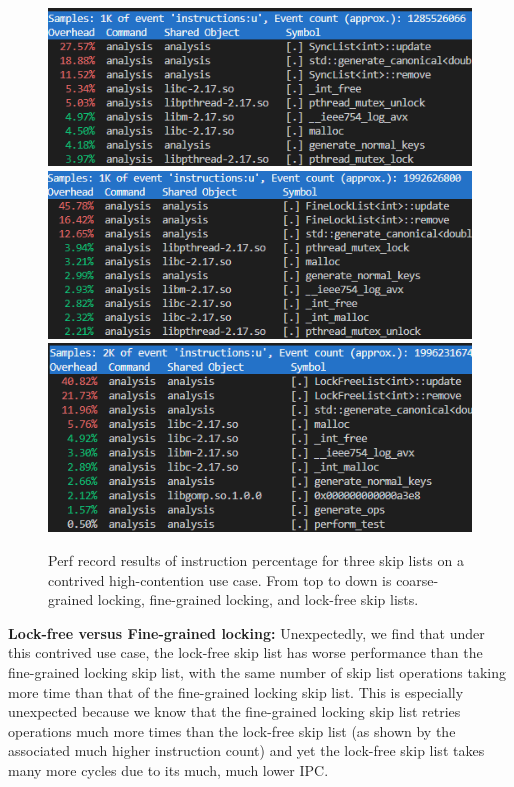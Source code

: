 \documentclass[11pt]{article}
\begin{document}
\begin{figure}[h!]
  \includegraphics[width=5in]{ex2_s0_instructions.png} \\
  \includegraphics[width=5in]{ex2_s1_instructions.png} \\
  \includegraphics[width=5in]{ex2_s2_instructions.png}
  \caption{Perf record results of instruction percentage for three skip lists on a contrived high-contention use case. From top to down is coarse-grained locking, fine-grained locking, and lock-free skip lists. }
\end{figure}

\textbf{Lock-free versus Fine-grained locking:}
Unexpectedly, we find that under this contrived use case, the lock-free skip list has worse performance than the fine-grained locking skip list, with the same number of skip list operations taking more time than that of the fine-grained locking skip list. This is especially unexpected because we know that the fine-grained locking skip list retries operations much more times than the lock-free skip list (as shown by the associated much higher instruction count) and yet the lock-free skip list takes many more cycles due to its much, much lower IPC. 
\end{document}
